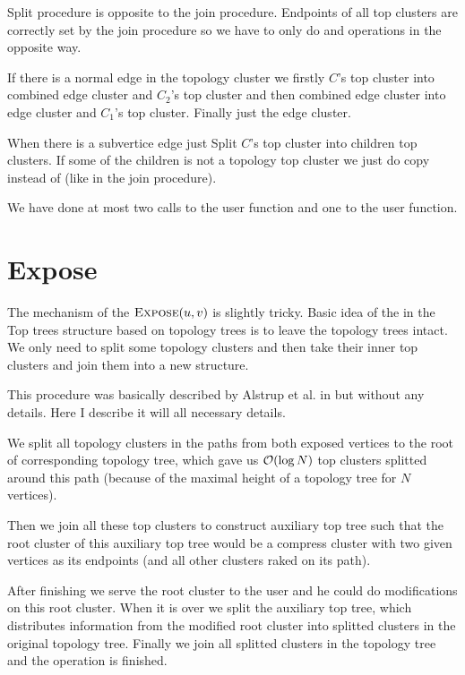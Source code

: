 Split procedure is opposite to the join procedure. Endpoints of all top clusters
are correctly set by the join procedure so we have to only do \Split{} and
\Destroy{} operations in the opposite way.

If there is a normal edge in the topology cluster we firstly \Split{} $C$'s
{\I top cluster} into {\I combined edge cluster} and $C_2$'s {\I top cluster}
and then \Split{} {\I combined edge cluster} into {\I edge cluster} and $C_1$'s
{\I top cluster}. Finally just \Destroy{} the {\I edge cluster}.

When there is a subvertice edge just Split $C$'s {\I top cluster} into children
{\I top clusters}. If some of the children is not a topology top cluster we just
do copy instead of \Split{} (like in the join procedure).

We have done at most two calls to the \Split{} user function and one to the
\Create{} user function.


\section{Expose}

The mechanism of the $\hbox{\sc Expose}(u,v)$ is slightly tricky. Basic idea of the
\Expose{} in the Top trees structure based on topology trees is to leave the
topology trees intact. We only need to split some topology clusters and then
take their inner top clusters and join them into a new structure.

This procedure was basically described by Alstrup et al. in \cite{TopTrees} but
without any details. Here I describe it will all necessary details.

We split all topology clusters in the paths from both exposed vertices to the
root of corresponding topology tree, which gave us ${\cal O}(\log N)$ top clusters
splitted around this path (because of the maximal height of a topology tree for
$N$ vertices).

Then we join all these top clusters to construct {\I auxiliary top tree} such
that the root cluster of this auxiliary top tree would be a compress cluster
with two given vertices as its endpoints (and all other clusters raked on its
path).

After finishing \Expose{} we serve the root cluster to the user and he could do
modifications on this root cluster. When it is over we split the auxiliary top
tree, which distributes information from the modified root cluster into splitted
clusters in the original topology tree. Finally we join all splitted clusters
in the topology tree and the operation is finished.

